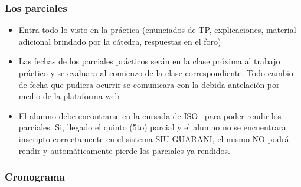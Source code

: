 \begin{frame}
  \frametitle{Los parciales}
  \begin{itemize}
	  \item Entra todo lo visto en la práctica (enunciados de TP, explicaciones, material adicional brindado por la cátedra, respuestas en el foro)
	  \item Las fechas de los parciales prácticos serán en la clase próxima al trabajo práctico y se evaluara al comienzo de la clase correspondiente. Todo cambio de fecha que pudiera ocurrir se comunicara con la debida antelación por medio de la plataforma web
	  \item El alumno debe encontrarse en la cursada de ISO \the\year\ para poder rendir los parciales. Si, llegado el quinto (5to) parcial y el alumno no se encuentrara inscripto correctamente en el sistema SIU-GUARANI, el mismo NO podrá rendir y automáticamente pierde los parciales ya rendidos.
  \end{itemize}
\end{frame}

\begin{frame}
	\frametitle{Cronograma}
	\begin{table}
	      \centering
	\end{table}
\end{frame}
